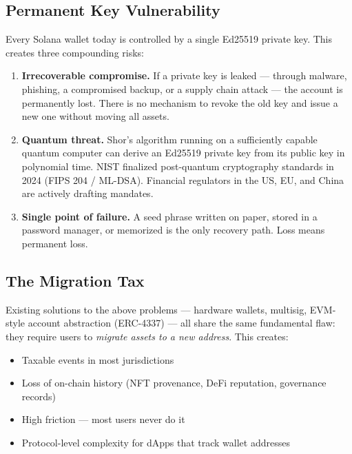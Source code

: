 \documentclass[11pt, a4paper]{article}
\begin{document}
\subsection{Permanent Key Vulnerability}

Every Solana wallet today is controlled by a single Ed25519 private key. This creates
three compounding risks:

\begin{enumerate}
  \item \textbf{Irrecoverable compromise.} If a private key is leaked --- through malware,
    phishing, a compromised backup, or a supply chain attack --- the account is permanently
    lost. There is no mechanism to revoke the old key and issue a new one without moving
    all assets.

  \item \textbf{Quantum threat.} Shor's algorithm running on a sufficiently capable quantum
    computer can derive an Ed25519 private key from its public key in polynomial time.
    NIST finalized post-quantum cryptography standards in 2024 (FIPS 204 / ML-DSA).
    Financial regulators in the US, EU, and China are actively drafting mandates.

  \item \textbf{Single point of failure.} A seed phrase written on paper, stored in a
    password manager, or memorized is the only recovery path. Loss means permanent
    loss.
\end{enumerate}

\subsection{The Migration Tax}

Existing solutions to the above problems --- hardware wallets, multisig, EVM-style account
abstraction (ERC-4337) --- all share the same fundamental flaw: they require users to
\textit{migrate assets to a new address}. This creates:

\begin{itemize}
  \item Taxable events in most jurisdictions
  \item Loss of on-chain history (NFT provenance, DeFi reputation, governance records)
  \item High friction --- most users never do it
  \item Protocol-level complexity for dApps that track wallet addresses
\end{itemize}
\end{document}
